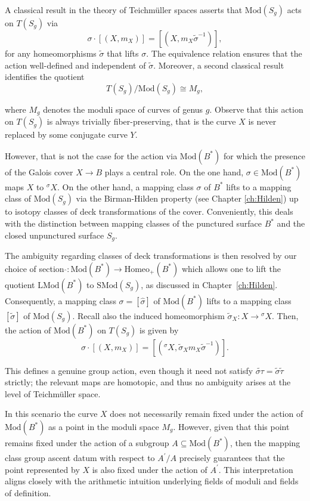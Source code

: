 \documentclass[10pt]{amsart}
\theoremstyle{definition}
\begin{document}
A classical result in the theory of Teichmüller spaces asserts that $\mathrm{Mod}(S_g)$ acts on $T(S_g)$ via 
\[
\sigma \cdot   [(X,m_X)]  = [(X,m_X \tilde{\sigma}^{-1})], 
\] 
for any homeomorphisms $\tilde{\sigma}$ that lifts $\sigma$. The equivalence relation ensures that the action well-defined and independent of $\tilde{\sigma}$. Moreover, a second classical result identifies the quotient
\[
T(S_g)/\mathrm{Mod}(S_g) \cong M_g,
\]

where $M_g$ denotes the moduli space of curves of genus $g$. Observe that this action on $T(S_g)$ is always trivially fiber-preserving, that is the curve $X$ is never replaced by some conjugate curve $Y$.

However, that is not the case for the action via $\mathrm{Mod}(B^*)$ for which the presence of the Galois cover $X\rightarrow B$ plays a central role. On the one hand, $\sigma \in\mathrm{Mod}(B^*)$ maps $X$ to ${^\sigma \! X}$. On the other hand, a mapping class $\sigma$ of $B^*$ lifts to a mapping class of $\mathrm{Mod}(S_g)$ via the Birman-Hilden property (see Chapter \ref{ch:Hilden}) up to isotopy classes of deck transformations of the cover. Conveniently, this deals with the distinction between mapping classes of the punctured surface $B^*$ and the closed unpunctured surface $S_g$. 

The ambiguity regarding classes of deck transformations is then resolved by our choice of section \linebreak 
$ \hat{} : \mathrm{Mod}(B^*) \rightarrow \mathrm{Homeo}_+(B^*)$ which allows one to lift the quotient $\mathrm{LMod}(B^*)$ to $\mathrm{SMod}(S_g)$, as discussed in Chapter~\ref{ch:Hilden}.
Consequently, a mapping class $\sigma = [\hat{\sigma}]$ of $\mathrm{Mod}(B^*)$ lifts to a mapping class $[\tilde{\sigma}]$ of $\mathrm{Mod}(S_g)$. Recall also the induced homeomorphism $\tilde{\sigma}_X \colon X\rightarrow {^\sigma X}$. Then, the action of $\mathrm{Mod}(B^*)$ on $T(S_g) $ is given by
\[
\sigma \cdot   [(X,m_X)]  = [({^\sigma \! X}, \tilde{\sigma}_X m_X \tilde{\sigma}^{-1})]. 
\]

This defines a genuine group action, even though it need not satisfy $\widetilde{\sigma \tau} = \tilde\sigma \tilde\tau$ strictly; the relevant maps are homotopic, and thus no ambiguity arises at the level of Teichmüller space.

In this scenario the curve $X$ does not necessarily remain fixed under the action of $\mathrm{Mod}(B^*)$ as a point in the moduli space $M_g$. However, given that this point remains fixed under the action of a subgroup $A\subseteq \mathrm{Mod}(B^*)$, then the mapping class group ascent datum with respect to $A^\prime/A$ precisely guarantees that the point represented by $X$ is also fixed under the action of $A^\prime$. This interpretation aligns closely with the arithmetic intuition underlying fields of moduli and fields of definition.
\end{document}
